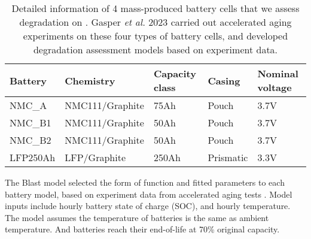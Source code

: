 \documentclass[11pt,preprint]{elsarticle}
\begin{document}
\begin{table}[ht]
    \centering
    \caption{Detailed information of 4 mass-produced battery cells that we assess degradation on \cite{gasper_degradation_2023}. Gasper \textit{et al.} 2023 carried out accelerated aging experiments on these four types of battery cells, and developed degradation assessment models based on experiment data.}
    \begin{tabular}{|l|llll|}
    \hline
        \textbf{Battery} & \textbf{Chemistry} & \textbf{Capacity class} & \textbf{Casing} & \textbf{Nominal voltage} \\ \hline
        NMC\_A  & NMC111/Graphite & 75Ah & Pouch & 3.7V \\ 
        NMC\_B1  & NMC111/Graphite & 50Ah & Pouch & 3.7V \\ 
        NMC\_B2 & NMC111/Graphite & 50Ah & Pouch & 3.7V \\ 
        LFP250Ah  & LFP/Graphite & 250Ah & Prismatic & 3.3V \\ \hline
    \end{tabular}\label{table:batteries}
\end{table}

The Blast model selected the form of function and fitted parameters to each battery model, based on experiment data from accelerated aging tests \cite{gasper_degradation_2023}. Model inputs include hourly battery state of charge (SOC), and hourly temperature. The model assumes the temperature of batteries is the same as ambient temperature. And batteries reach their end-of-life at 70\% original capacity. 
\end{document}
